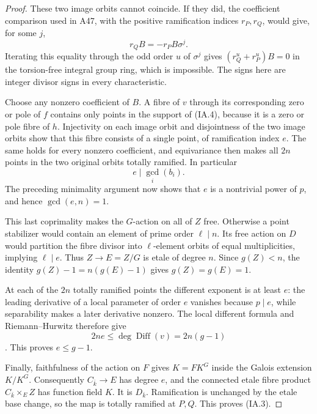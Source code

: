 \documentclass[11pt,a4paper]{article}
\begin{document}
\begin{proof}
These two image orbits cannot coincide. If they did, the coefficient
comparison used in A47, with the positive ramification indices $r_P,r_Q$,
would give, for some $j$,
\[
                         r_QB=-r_PB\sigma^j.
\tag{IA.7}
\]
Iterating this equality through the odd order $u$ of $\sigma^j$ gives
$(r_Q^u+r_P^u)B=0$ in the torsion-free integral group ring, which is
impossible. The signs here are integer divisor signs in every
characteristic.

Choose any nonzero coefficient of $B$. A fibre of $v$ through its
corresponding zero or pole of $f$ contains only points in the support of
(IA.4), because it is a zero or pole fibre of $h$. Injectivity on each
image orbit and disjointness of the two image orbits show that this
fibre consists of a single point, of ramification index $e$. The same
holds for every nonzero coefficient, and equivariance then makes all
$2n$ points in the two original orbits totally ramified. In particular
\[
                           e\mid\gcd_i(b_i).
\tag{IA.8}
\]
The preceding minimality argument now shows that $e$ is a nontrivial
power of $p$, and hence $\gcd(e,n)=1$.

This last coprimality makes the $G$-action on all of $Z$ free. Otherwise
a point stabilizer would contain an element of prime order $\ell\mid n$.
Its free action on $D$ would partition the fibre divisor into
$\ell$-element orbits of equal multiplicities, implying $\ell\mid e$.
Thus $Z\to E=Z/G$ is etale of degree $n$. Since $g(Z)<n$, the identity
$g(Z)-1=n(g(E)-1)$ gives $g(Z)=g(E)=1$.

At each of the $2n$ totally ramified points the different exponent is
at least $e$: the leading derivative of a local parameter of order
$e$ vanishes because $p\mid e$, while separability makes a later
derivative nonzero. The local different formula and Riemann--Hurwitz
therefore give
\[
                  2ne\le\deg\operatorname{Diff}(v)=2n(g-1)
\tag{IA.9}
\]
\cite[Lemma~53.12.4, Tag~\texttt{0C1F}]{StacksRH}.
This proves $e\le g-1$.

Finally, faithfulness of the action on $F$ gives $K=FK^G$ inside the
Galois extension $K/K^G$. Consequently $C_{\bar k}\to E$ has degree
$e$, and the connected etale fibre product $C_{\bar k}\times_E Z$ has
function field $K$. It is $D_{\bar k}$. Ramification is unchanged by
the etale base change, so the map is totally ramified at $P,Q$.
This proves (IA.3).
\end{proof}
\end{document}
